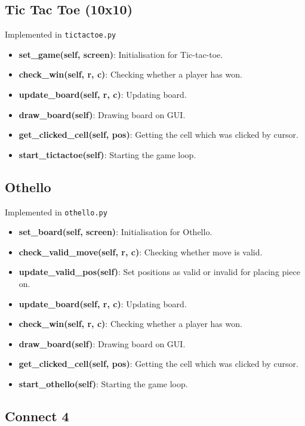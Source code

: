 \documentclass[12pt,a4paper]{article}
\begin{document}
\subsection{Tic Tac Toe (10x10)}

Implemented in \texttt{tictactoe.py}

\begin{itemize}
    \item \textbf{set\_game(self, screen)}: Initialisation for Tic-tac-toe.
    \item \textbf{check\_win(self, r, c)}: Checking whether a player has won.
    \item \textbf{update\_board(self, r, c)}: Updating board.
    \item \textbf{draw\_board(self)}: Drawing board on GUI.
    \item \textbf{get\_clicked\_cell(self, pos)}: Getting the cell which was clicked by cursor.
    \item \textbf{start\_tictactoe(self)}: Starting the game loop.
\end{itemize}

\subsection{Othello}

Implemented in \texttt{othello.py}

\begin{itemize}
    \item \textbf{set\_board(self, screen)}: Initialisation for Othello.
    \item \textbf{check\_valid\_move(self, r, c)}: Checking whether move is valid.
    \item \textbf{update\_valid\_pos(self)}: Set positions as valid or invalid for placing piece on.
    \item \textbf{update\_board(self, r, c)}: Updating board.
    \item \textbf{check\_win(self, r, c)}: Checking whether a player has won.
    \item \textbf{draw\_board(self)}: Drawing board on GUI.
    \item \textbf{get\_clicked\_cell(self, pos)}: Getting the cell which was clicked by cursor.
    \item \textbf{start\_othello(self)}: Starting the game loop.
\end{itemize}

\subsection{Connect 4}
\end{document}
